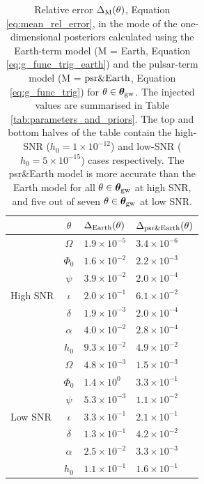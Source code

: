 \documentclass[fleqn,usenatbib,useAMS]{mnras}
\begin{document}
\begin{table}
	\centering
		\begin{tabular}{lcll}
			\toprule
			&$\theta$ & $\Delta_{\rm Earth}(\theta)$ & $\Delta_{\rm psr \& Earth}(\theta)$  \\
			\hline
			\multirow{7}{2mm}{High SNR} & $\Omega$       & $1.9 \times 10^{-5}$& $3.4 \times 10^{-6}$\\
			& $\Phi_0$ &$1.6 \times 10^{-2}$ &$2.2 \times 10^{-3}$ \\
			& $\psi$ &$3.9 \times 10^{-2}$ &$2.0 \times 10^{-4}$  \\
			& $\iota$ & $2.0 \times 10^{-1}$ & $6.1 \times 10^{-2}$  \\
			& $\delta$ &$1.9 \times10^{-3}$ &$2.0 \times 10^{-4}$  \\
			&$\alpha$ &$4.0 \times 10^{-2}$ &$2.8 \times10^{-4}$  \\
			&$h_0$ & $9.3 \times 10^{-2}$ &$4.9 \times 10^{-2}$  \\
			\hline
			\multirow{7}{2mm}{Low SNR} & $\Omega$       &  $4.8 \times 10^{-3}$ &$1.5 \times 10^{-3}$ \\
			& $\Phi_0$ &$1.4 \times 10^{0}$ & $3.3 \times 10^{-1}$  \\
			& $\psi$ &$5.3 \times 10^{-3}$ &$1.1 \times 10^{-2}$  \\
			& $\iota$ & $3.3 \times 10^{-1}$ & $2.1 \times 10^{-1}$  \\
			& $\delta$ & $1.3 \times 10^{-1}$ & $4.2 \times 10^{-2}$  \\
			&$\alpha$ & $2.5 \times 10^{-2}$ & $3.3 \times 10^{-3}$ \\
			&$h_0$ & $1.1 \times 10^{-1}$ &$1.6 \times 10^{-1}$ \\
			\bottomrule
		\end{tabular}
		\caption{Relative error $\Delta_{\rm M}(\theta)$, Equation \eqref{eq:mean_rel_error}, in the mode of the one-dimensional posteriors calculated using the Earth-term model (M = Earth, Equation \eqref{eq:g_func_trig_earth}) and the pulsar-term model (M = $\rm psr \& Earth$, Equation \eqref{eq:g_func_trig}) for $\theta \in \boldsymbol{\theta}_{\rm gw}$. The injected values are summarised in Table \ref{tab:parameters_and_priors}. The top and bottom halves of the table contain the high-SNR ($h_0 =1 \times 10^{-12}$) and low-SNR ($h_0 = 5 \times 10^{-15}$) cases respectively. The psr\&Earth model is more accurate than the Earth model for all $\theta \in \boldsymbol{\theta}_{\rm gw}$ at high SNR, and five out of seven $\theta \in \boldsymbol{\theta}_{\rm gw}$ at low SNR.}
		\label{tab:posterior_errors}
	\end{table}
\end{document}
